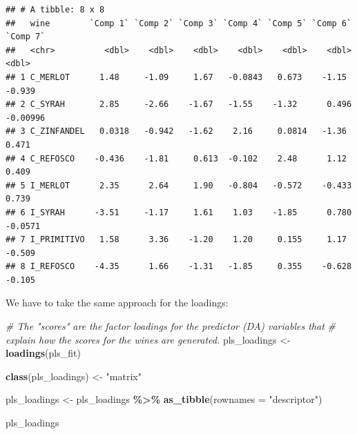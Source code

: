 \documentclass[
]{book}
\newenvironment{Shaded}{\begin{snugshade}}{\end{snugshade}}
\newcommand{\AttributeTok}[1]{\textcolor[rgb]{0.13,0.29,0.53}{#1}}
\newcommand{\CommentTok}[1]{\textcolor[rgb]{0.56,0.35,0.01}{\textit{#1}}}
\newcommand{\FunctionTok}[1]{\textcolor[rgb]{0.13,0.29,0.53}{\textbf{#1}}}
\newcommand{\NormalTok}[1]{#1}
\newcommand{\OtherTok}[1]{\textcolor[rgb]{0.56,0.35,0.01}{#1}}
\newcommand{\SpecialCharTok}[1]{\textcolor[rgb]{0.81,0.36,0.00}{\textbf{#1}}}
\newcommand{\StringTok}[1]{\textcolor[rgb]{0.31,0.60,0.02}{#1}}
\begin{document}
\begin{verbatim}
## # A tibble: 8 x 8
##   wine        `Comp 1` `Comp 2` `Comp 3` `Comp 4` `Comp 5` `Comp 6` `Comp 7`
##   <chr>          <dbl>    <dbl>    <dbl>    <dbl>    <dbl>    <dbl>    <dbl>
## 1 C_MERLOT      1.48     -1.09     1.67   -0.0843   0.673    -1.15  -0.939  
## 2 C_SYRAH       2.85     -2.66    -1.67   -1.55    -1.32      0.496 -0.00996
## 3 C_ZINFANDEL   0.0318   -0.942   -1.62    2.16     0.0814   -1.36   0.471  
## 4 C_REFOSCO    -0.436    -1.81     0.613  -0.102    2.48      1.12   0.409  
## 5 I_MERLOT      2.35      2.64     1.90   -0.804   -0.572    -0.433  0.739  
## 6 I_SYRAH      -3.51     -1.17     1.61    1.03    -1.85      0.780 -0.0571 
## 7 I_PRIMITIVO   1.58      3.36    -1.20    1.20     0.155     1.17  -0.509  
## 8 I_REFOSCO    -4.35      1.66    -1.31   -1.85     0.355    -0.628 -0.105
\end{verbatim}

We have to take the same approach for the loadings:

\begin{Shaded}
\begin{Highlighting}[]
\CommentTok{\# The "scores" are the factor loadings for the predictor (DA) variables that}
\CommentTok{\# explain how the scores for the wines are generated.}
\NormalTok{pls\_loadings }\OtherTok{\textless{}{-}} \FunctionTok{loadings}\NormalTok{(pls\_fit)}

\FunctionTok{class}\NormalTok{(pls\_loadings) }\OtherTok{\textless{}{-}} \StringTok{"matrix"}

\NormalTok{pls\_loadings }\OtherTok{\textless{}{-}} 
\NormalTok{  pls\_loadings }\SpecialCharTok{\%\textgreater{}\%}
  \FunctionTok{as\_tibble}\NormalTok{(}\AttributeTok{rownames =} \StringTok{"descriptor"}\NormalTok{)}

\NormalTok{pls\_loadings}
\end{Highlighting}
\end{Shaded}
\end{document}
